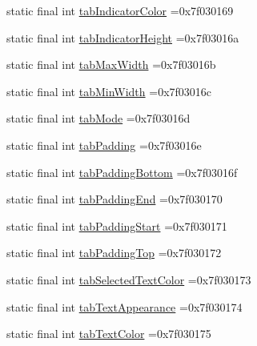 \begin{DoxyCompactItemize}
\item 
static final int \mbox{\hyperlink{classcom_1_1example_1_1trainawearapplication_1_1_r_1_1attr_ad2b3d72bf91d922bd86b1bf13cd8bcc3}{tab\+Indicator\+Color}} =0x7f030169
\item 
static final int \mbox{\hyperlink{classcom_1_1example_1_1trainawearapplication_1_1_r_1_1attr_a8df20a36259c674fbacb811e1e5f96dd}{tab\+Indicator\+Height}} =0x7f03016a
\item 
static final int \mbox{\hyperlink{classcom_1_1example_1_1trainawearapplication_1_1_r_1_1attr_adeddc39b55eccd7dcb3e55484b70911a}{tab\+Max\+Width}} =0x7f03016b
\item 
static final int \mbox{\hyperlink{classcom_1_1example_1_1trainawearapplication_1_1_r_1_1attr_a962cab305acbc7f337ea16fd1379e89f}{tab\+Min\+Width}} =0x7f03016c
\item 
static final int \mbox{\hyperlink{classcom_1_1example_1_1trainawearapplication_1_1_r_1_1attr_ae946956afe3fac2b38e6db110301fa35}{tab\+Mode}} =0x7f03016d
\item 
static final int \mbox{\hyperlink{classcom_1_1example_1_1trainawearapplication_1_1_r_1_1attr_ae63de6153dcc2a0eabf0ee8bda16d1bd}{tab\+Padding}} =0x7f03016e
\item 
static final int \mbox{\hyperlink{classcom_1_1example_1_1trainawearapplication_1_1_r_1_1attr_a3f92c8446b11e2e424883e60986f32bb}{tab\+Padding\+Bottom}} =0x7f03016f
\item 
static final int \mbox{\hyperlink{classcom_1_1example_1_1trainawearapplication_1_1_r_1_1attr_a034c23069692bab8f23351e9e226686e}{tab\+Padding\+End}} =0x7f030170
\item 
static final int \mbox{\hyperlink{classcom_1_1example_1_1trainawearapplication_1_1_r_1_1attr_afba258ee57f4c1de5a01ad540f1713e0}{tab\+Padding\+Start}} =0x7f030171
\item 
static final int \mbox{\hyperlink{classcom_1_1example_1_1trainawearapplication_1_1_r_1_1attr_a6ab259800ce809ed57002b08ff33214c}{tab\+Padding\+Top}} =0x7f030172
\item 
static final int \mbox{\hyperlink{classcom_1_1example_1_1trainawearapplication_1_1_r_1_1attr_af7c545616ba0518eba8b3b1d51d9ed3f}{tab\+Selected\+Text\+Color}} =0x7f030173
\item 
static final int \mbox{\hyperlink{classcom_1_1example_1_1trainawearapplication_1_1_r_1_1attr_a476079ef276d01b45e947ae8af3e7163}{tab\+Text\+Appearance}} =0x7f030174
\item 
static final int \mbox{\hyperlink{classcom_1_1example_1_1trainawearapplication_1_1_r_1_1attr_a00c460d6916893121f484539104b8b31}{tab\+Text\+Color}} =0x7f030175

\end{DoxyCompactItemize}
